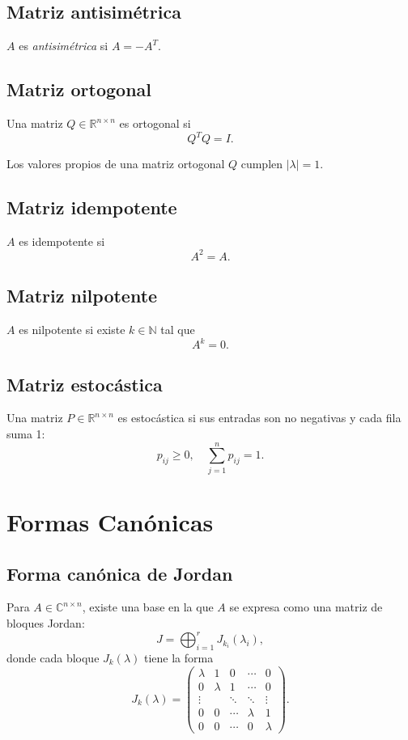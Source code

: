 \documentclass{article}
\begin{document}
\subsection{Matriz antisimétrica}
\( A \) es \emph{antisimétrica} si \( A = -A^T \).


\subsection{Matriz ortogonal}
Una matriz \( Q \in \mathbb{R}^{n \times n} \) es ortogonal si
\[
Q^T Q = I.
\]


Los valores propios de una matriz ortogonal \( Q \) cumplen \(|\lambda|=1\).


\subsection{Matriz idempotente}
\( A \) es idempotente si
\[
A^2 = A.
\]


\subsection{Matriz nilpotente}
\( A \) es nilpotente si existe \( k \in \mathbb{N} \) tal que
\[
A^k = 0.
\]


\subsection{Matriz estocástica}
Una matriz \( P \in \mathbb{R}^{n \times n} \) es estocástica si sus entradas son no negativas y cada fila suma 1:
\[
p_{ij} \geq 0, \quad \sum_{j=1}^n p_{ij} = 1.
\]


\section{Formas Canónicas}

\subsection{Forma canónica de Jordan}
Para \( A \in \mathbb{C}^{n \times n} \), existe una base en la que \( A \) se expresa como una matriz de bloques Jordan:
\[
J = \bigoplus_{i=1}^r J_{k_i}(\lambda_i),
\]
donde cada bloque \( J_{k}(\lambda) \) tiene la forma
\[
J_k(\lambda) = 
\begin{pmatrix}
\lambda & 1 & 0 & \cdots & 0 \\
0 & \lambda & 1 & \cdots & 0 \\
\vdots & & \ddots & \ddots & \vdots \\
0 & 0 & \cdots & \lambda & 1 \\
0 & 0 & \cdots & 0 & \lambda
\end{pmatrix}.
\]
\end{document}

